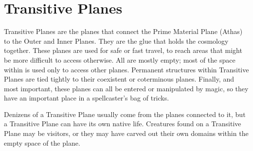 \section{Transitive Planes}
Transitive Planes are the planes that connect the Prime Material Plane (Athas) to the Outer and Inner Planes. They are the glue that holds the cosmology together. These planes are used for safe or fast travel, to reach areas that might be more difficult to access otherwise. All are mostly empty; most of the space within is used only to access other planes. Permanent structures within Transitive Planes are tied tightly to their coexistent or coterminous planes. Finally, and most important, these planes can all be entered or manipulated by magic, so they have an important place in a spellcaster's bag of tricks.

Denizens of a Transitive Plane usually come from the planes connected to it, but a Transitive Plane can have its own native life. Creatures found on a Transitive Plane may be visitors, or they may have carved out their own domains within the empty space of the plane.




